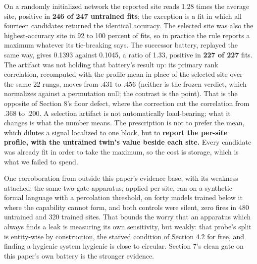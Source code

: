 On a randomly initialized network the reported site reads 1.28 times
the average site, positive in \textbf{246 of 247 untrained fits}; the
exception is a fit in which all fourteen candidates returned the
identical accuracy. The selected site was also the highest-accuracy
site in 92 to 100 percent of fits, so in practice the rule reports a
maximum whatever its tie-breaking says. The successor battery,
replayed the same way, gives 0.1393 against 0.1045, a ratio of 1.33,
positive in \textbf{227 of 227} fits. The artifact was not holding that
battery's result up: its primary rank correlation, recomputed with the
profile mean in place of the selected site over the same 22 rungs,
moves from .431 to .456 (neither is the frozen verdict, which
normalizes against a permutation null; the contrast is the point).
That is the opposite of Section 8's floor defect, where the correction
cut the correlation from .368 to .200. A selection artifact is not
automatically load-bearing; what it changes is what the number means.
The prescription is not to prefer the mean, which dilutes a signal
localized to one block, but to \textbf{report the per-site profile, with the
untrained twin's value beside each site.} Every candidate was already
fit in order to take the maximum, so the cost is storage, which is
what we failed to spend.

One corroboration from outside this paper's evidence base, with its
weakness attached: the same two-gate apparatus, applied per site, ran
on a synthetic formal language with a percolation threshold, on forty
models trained below it where the capability cannot form, and both
controls were silent, zero fires in 480 untrained and 320 trained
sites. That bounds the worry that an apparatus which always finds a
leak is measuring its own sensitivity, but weakly: that probe's split
is entity-wise by construction, the starved condition of Section 4.2
for free, and finding a hygienic system hygienic is close to circular.
Section 7's clean gate on this paper's own battery is the stronger
evidence.

